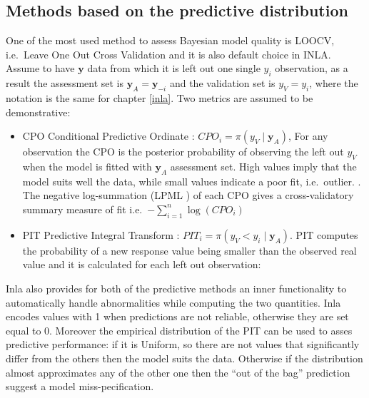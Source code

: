 \documentclass[
  12pt,
  a4paper,
  oneside]{book}
\providecommand{\tightlist}{%
  \setlength{\itemsep}{0pt}\setlength{\parskip}{0pt}}
\theoremstyle{definition}
\theoremstyle{definition}
\theoremstyle{definition}
\theoremstyle{remark}
\begin{document}
\hypertarget{predbase}{%
\subsection{Methods based on the predictive distribution}\label{predbase}}

One of the most used method to assess Bayesian model quality is LOOCV, i.e.~Leave One Out Cross Validation and it is also default choice in INLA. Assume to have \(\boldsymbol{y}\) data from which it is left out one single \(y_i\) observation, as a result the assessment set is \(\boldsymbol{y}_{A} = \boldsymbol{y}_{-i}\) and the validation set is \({y}_{V} = y_{i}\), where the notation is the same for chapter \ref{inla}. Two metrics are assumed to be demonstrative:

\begin{itemize}
\tightlist
\item
  CPO Conditional Predictive Ordinate \citep{petit1990}: \(CPO_{i} = \pi(y_{V} \mid \boldsymbol{y}_{A})\), For any observation the CPO is the posterior probability of observing the left out \(y_{V}\) when the model is fitted with \(\boldsymbol{y}_A\) assessment set. High values imply that the model suits well the data, while small values indicate a poor fit, i.e.~outlier. \citep{Bayesian_INLA_Rubio}. The negative log-summation (LPML \citet{lpml}) of each CPO gives a cross-validatory summary measure of fit \citep{wang2018bayesian} i.e.~\(-\sum_{i=1}^{n} \log \left(C P O_{i}\right)\)
\item
  PIT Predictive Integral Transform \citep{marshall2007}: \(PIT_{i} = \pi(y_{V} < y_{i} \mid \boldsymbol{y}_{A})\). PIT computes the probability of a new response value being smaller than the observed real value and it is calculated for each left out observation:
\end{itemize}

Inla also provides for both of the predictive methods an inner functionality to automatically handle abnormalities while computing the two quantities. Inla encodes values with 1 when predictions are not reliable, otherwise they are set equal to 0. Moreover the empirical distribution of the PIT can be used to asses predictive performance: if it is Uniform, so there are not values that significantly differ from the others then the model suits the data. Otherwise if the distribution almost approximates any of the other one then the ``out of the bag'' prediction suggest a model miss-pecification.
\end{document}
